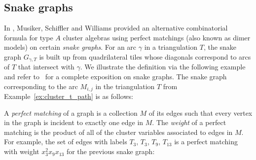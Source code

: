 \documentclass[pdftex]{sigma}
\numberwithin{equation}{section}
\begin{document}
\subsection{Snake graphs}
In \cite{MSW}, Musiker, Schiffler and Williams provided an alternative combinatorial formula for type $A$ cluster algebras using perfect matchings (also known as dimer models) on certain \emph{snake graphs}.
For an arc $\gamma$ in a triangulation $T$, the snake graph $G_{\gamma, T}$ is built up from quadrilateral tiles whose diagonals correspond to arcs of $T$ that intersect with $\gamma$. We illustrate the definition via the following example and refer to~\cite{MSW} for a complete exposition on snake graphs.
The snake graph corresponding to the arc $M_{i,j}$ in the triangulation $T$ from Example~\ref{ex:cluster_t_path} is as follows:
\begin{center}
\end{center}
A \emph{perfect matching} of a graph is a collection $M$ of its edges such that every vertex in the graph is incident to exactly one edge in $M$. The \emph{weight} of a perfect matching is the product of all of the cluster variables associated to edges in $M$. For example, the set of edges with labels $T_3$, $T_3$, $T_9$, $T_{13}$ is a perfect matching with weight $x_{3}^2x_{9}x_{13}$ for the previous snake graph:
\end{document}
